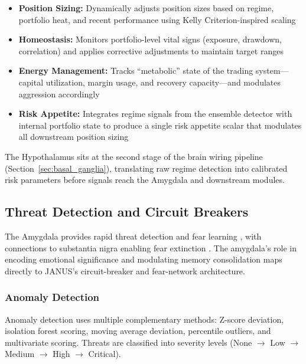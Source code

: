\documentclass[12pt, a4paper]{article}
\begin{document}
\begin{itemize}
	\item \textbf{Position Sizing:} Dynamically adjusts position sizes based on regime, portfolio heat, and recent performance using Kelly Criterion-inspired scaling
	\item \textbf{Homeostasis:} Monitors portfolio-level vital signs (exposure, drawdown, correlation) and applies corrective adjustments to maintain target ranges
	\item \textbf{Energy Management:} Tracks ``metabolic'' state of the trading system---capital utilization, margin usage, and recovery capacity---and modulates aggression accordingly
	\item \textbf{Risk Appetite:} Integrates regime signals from the ensemble detector with internal portfolio state to produce a single risk appetite scalar that modulates all downstream position sizing
\end{itemize}

The Hypothalamus sits at the second stage of the brain wiring pipeline (Section~\ref{sec:basal_ganglia}), translating raw regime detection into calibrated risk parameters before signals reach the Amygdala and downstream modules.

\subsection{Threat Detection and Circuit Breakers}
\label{sec:amygdala}

The Amygdala provides rapid threat detection and fear learning \citep{ledoux2000emotion}, with connections to substantia nigra enabling fear extinction \citep{monfils2009extinction}. The amygdala's role in encoding emotional significance and modulating memory consolidation maps directly to JANUS's circuit-breaker and fear-network architecture.

\subsubsection{Anomaly Detection}

Anomaly detection uses multiple complementary methods: Z-score deviation, isolation forest scoring, moving average deviation, percentile outliers, and multivariate scoring. Threats are classified into severity levels (None $\to$ Low $\to$ Medium $\to$ High $\to$ Critical).
\end{document}

